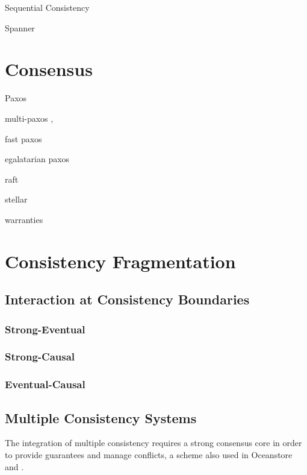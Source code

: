 \documentclass[letterpaper,twocolumn,10pt]{article}
\begin{document}
Sequential Consistency \cite{attiya_sequential_1994}

Spanner \cite{corbett_spanner_2013}

\section{Consensus}

Paxos \cite{lamport_paxos_2001}

multi-paxos \cite{chandra_paxos_2007},

fast paxos \cite{lamport_fast_2006} 

egalatarian paxos \cite{moraru_there_2013,moraru_egalitarian_2012}

raft \cite{ongaro_search_2013,howard_raft_2015}

stellar \cite{mazieres_stellar_2015}

warranties \cite{liu_warranties_2014}

\section{Consistency Fragmentation}

\subsection{Interaction at Consistency Boundaries}

\subsubsection{Strong-Eventual}

\subsubsection{Strong-Causal}

\subsubsection{Eventual-Causal}

\subsection{Multiple Consistency Systems}

The integration of multiple consistency requires a strong consensus core in order to provide guarantees and manage conflicts, a scheme also used in Oceanstore \cite{kubiatowicz_oceanstore_2000} and \cite{gray_dangers_1996}.
\end{document}
